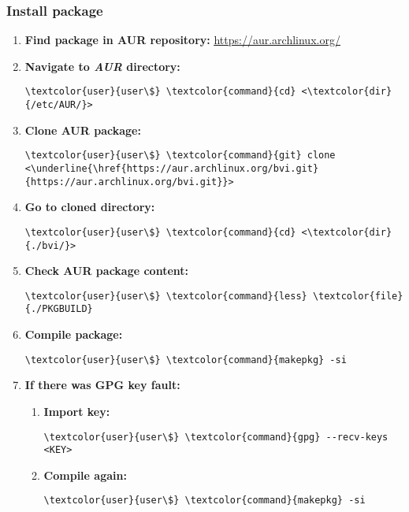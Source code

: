 \documentclass[10pt, a4paper, onecolumn, openany]{book} %
\begin{document}
\subsubsection{Install package}
\label{aur_install}
\begin{enumerate}
    \item \textbf{Find package in AUR repository:}
\newline \underline{\href{https://aur.archlinux.org/}{https://aur.archlinux.org/}}
    \item \textbf{Navigate to \textit{AUR} directory:}
\begin{Verbatim}[commandchars=\\\{\}]
\textcolor{user}{user\$} \textcolor{command}{cd} <\textcolor{dir}{/etc/AUR/}>
\end{Verbatim}
    \item \textbf{Clone AUR package:}
\begin{Verbatim}[commandchars=\\\{\}]
\textcolor{user}{user\$} \textcolor{command}{git} clone <\underline{\href{https://aur.archlinux.org/bvi.git}{https://aur.archlinux.org/bvi.git}}>
\end{Verbatim}
    \item \textbf{Go to cloned directory:}
\begin{Verbatim}[commandchars=\\\{\}]
\textcolor{user}{user\$} \textcolor{command}{cd} <\textcolor{dir}{./bvi/}>
\end{Verbatim}
    \item \textbf{Check AUR package content:}
\begin{Verbatim}[commandchars=\\\{\}]
\textcolor{user}{user\$} \textcolor{command}{less} \textcolor{file}{./PKGBUILD}
\end{Verbatim}
    \item \textbf{Compile package:}
\begin{Verbatim}[commandchars=\\\{\}]
\textcolor{user}{user\$} \textcolor{command}{makepkg} -si
\end{Verbatim}
    \item \textbf{If there was GPG key fault:}
    \begin{enumerate}
        \item \textbf{Import key:}
\begin{Verbatim}[commandchars=\\\{\}]
\textcolor{user}{user\$} \textcolor{command}{gpg} --recv-keys <KEY>
\end{Verbatim}
        \item \textbf{Compile again:}
\begin{Verbatim}[commandchars=\\\{\}]
\textcolor{user}{user\$} \textcolor{command}{makepkg} -si
\end{Verbatim}
    \end{enumerate}
\end{enumerate}
\end{document}
